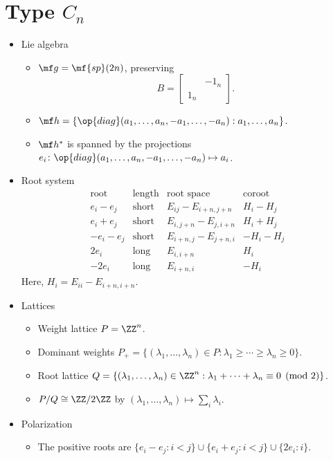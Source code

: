 \documentclass{article}
\begin{document}
\section{Type \texorpdfstring{$C_n$}{ C n}}
\begin{itemize}
	\item Lie algebra
	\begin{itemize}
		\item $\mf g=\mf{sp}(2n)$, preserving
		\[B=\begin{bmatrix}
			& -1_n \\ 1_n
		\end{bmatrix}.\]
		\item $\mf h=\{\op{diag}(a_1,\ldots,a_n,-a_1,\ldots,-a_n):a_1,\ldots,a_n\}$.
		\item $\mf h^*$ is spanned by the projections $e_i\colon\op{diag}(a_1,\ldots,a_n,-a_1,\ldots,-a_n)\mapsto a_i$.
	\end{itemize}
	\item Root system
	\[\begin{array}{c|cccccc}
		\text{root} & \text{length} & \text{root space} & \text{coroot} \\\hline
		e_i-e_j & \text{short} & E_{ij}-E_{i+n,j+n} & H_i-H_j \\
		e_i+e_j & \text{short} & E_{i,j+n}-E_{j,i+n} & H_i+H_j \\
		-e_i-e_j & \text{short} & E_{i+n,j}-E_{j+n,i} & -H_i-H_j \\
		2e_i & \text{long} & E_{i,i+n} & H_i \\
		-2e_i & \text{long} & E_{i+n,i} & -H_i
	\end{array}\]
	Here, $H_i=E_{ii}-E_{i+n,i+n}$.
	\item Lattices
	\begin{itemize}
		\item Weight lattice $P=\ZZ^n$.
		\item Dominant weights $P_+=\{(\lambda_1,\ldots,\lambda_n)\in P:\lambda_1\ge\cdots\ge\lambda_n\ge0\}$.
		\item Root lattice $Q=\{(\lambda_1,\ldots,\lambda_n)\in\ZZ^n:\lambda_1+\cdots+\lambda_n\equiv0\pmod2\}$.
		\item $P/Q\cong\ZZ/2\ZZ$ by $(\lambda_1,\ldots,\lambda_n)\mapsto\sum_i\lambda_i$.
	\end{itemize}
	\item Polarization
	\begin{itemize}
		\item The positive roots are $\{e_i-e_j:i<j\}\cup\{e_i+e_j:i<j\}\cup\{2e_i:i\}$.

\end{itemize}
\end{itemize}
\end{document}
